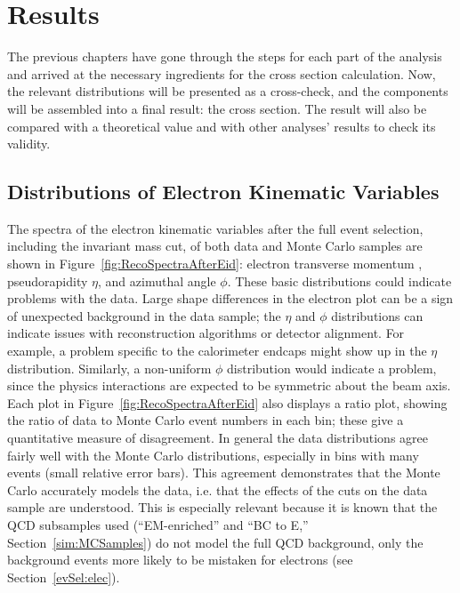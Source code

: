 \chapter{Results}
\label{res}

The previous chapters have gone through the steps 
for each part of the analysis 
and arrived at the necessary ingredients 
for the cross section calculation.  
Now, the relevant distributions will be presented 
as a cross-check, 
and the components will be assembled into a 
final result: the \Zee cross section.  
The result 
will %
also be compared with 
a theoretical value and with other 
analyses' results to check its validity.  

\section{Distributions of Electron Kinematic Variables}
\label{res:elecQuants}

The spectra of the electron kinematic variables after the full 
event selection, including the invariant mass cut, 
of both data and Monte Carlo samples 
are shown in Figure~\ref{fig:RecoSpectraAfterEid}: 
electron transverse momentum \pt, 
pseudorapidity $\eta$, and 
azimuthal angle $\phi$.  
These basic distributions could indicate problems with the data.  
Large shape differences in the electron \pT plot can 
be a sign of unexpected background in the data sample; 
the $\eta$ and $\phi$ distributions can indicate issues with 
reconstruction algorithms or detector alignment.  
For example, a problem specific to the calorimeter endcaps 
might show up in the $\eta$ distribution. 
Similarly, a non-uniform $\phi$ distribution would 
indicate a problem, since the physics interactions 
are expected to be symmetric about the beam axis.  
Each plot in Figure~\ref{fig:RecoSpectraAfterEid} also 
displays a ratio plot, showing the ratio of data to Monte Carlo 
event numbers in each bin; 
these give a quantitative measure of disagreement.  
In general the data distributions agree fairly well with the 
Monte Carlo distributions, 
especially in bins with many events (small relative error bars).  
This agreement demonstrates that 
the Monte Carlo accurately models the data, i.e. that 
the effects of the cuts on 
the data sample are understood.  
This is especially relevant because it is known that the 
QCD subsamples used (``EM-enriched'' and ``BC to E,'' Section~\ref{sim:MCSamples}) 
do not model the full QCD background, 
only the background events more likely to be mistaken 
for electrons (see Section~\ref{evSel:elec}).  

